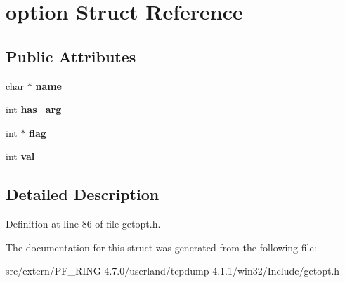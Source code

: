\hypertarget{structoption}{
\section{option Struct Reference}
\label{structoption}
}
\subsection*{Public Attributes}
\begin{DoxyCompactItemize}
\item 
\hypertarget{structoption_a92c850a23c7828c1dba453bf8d15e1f0}{
char $\ast$ {\bfseries name}}
\label{structoption_a92c850a23c7828c1dba453bf8d15e1f0}

\item 
\hypertarget{structoption_a90d7ee9a51eea5c002682dbd0af149e4}{
int {\bfseries has\_\-arg}}
\label{structoption_a90d7ee9a51eea5c002682dbd0af149e4}

\item 
\hypertarget{structoption_ab366eea5fe7be25c1928328ba715e353}{
int $\ast$ {\bfseries flag}}
\label{structoption_ab366eea5fe7be25c1928328ba715e353}

\item 
\hypertarget{structoption_a13bd155ec3b405d29c41ab8d0793be11}{
int {\bfseries val}}
\label{structoption_a13bd155ec3b405d29c41ab8d0793be11}

\end{DoxyCompactItemize}


\subsection{Detailed Description}


Definition at line 86 of file getopt.h.



The documentation for this struct was generated from the following file:\begin{DoxyCompactItemize}
\item 
src/extern/PF\_\-RING-\/4.7.0/userland/tcpdump-\/4.1.1/win32/Include/getopt.h\end{DoxyCompactItemize}
